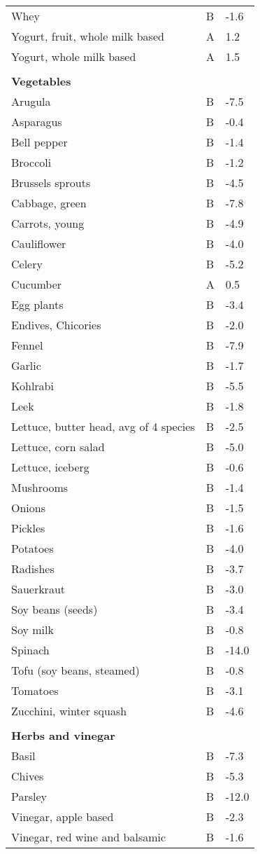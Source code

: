 \documentclass[../main.tex]{subfiles}
\begin{document}
\begin{longtable}{p{7cm}p{0.5cm}p{1cm}}
Whey  & B  & -1.6 \\
Yogurt, fruit, whole milk based  & A  & 1.2 \\
Yogurt, whole milk based  & A  & 1.5 \\
 \\
\multicolumn{3}{l}{\textbf{Vegetables}}  \\
Arugula  & B  & -7.5 \\
Asparagus  & B  & -0.4 \\
Bell pepper  & B  & -1.4 \\
Broccoli  & B  & -1.2 \\
Brussels sprouts  & B  & -4.5 \\
Cabbage, green  & B  & -7.8 \\
Carrots, young  & B  & -4.9 \\
Cauliflower  & B  & -4.0 \\
Celery  & B  & -5.2 \\
Cucumber  & A  & 0.5 \\
Egg plants  & B  & -3.4 \\
Endives, Chicories  & B  & -2.0 \\
Fennel  & B  & -7.9 \\
Garlic   & B  & -1.7 \\
Kohlrabi  & B  & -5.5 \\
Leek  & B  & -1.8 \\
Lettuce, butter head, avg of 4 species  & B  & -2.5 \\
Lettuce, corn salad   & B  & -5.0 \\
Lettuce, iceberg  & B  & -0.6 \\
Mushrooms  & B  & -1.4 \\
Onions  & B  & -1.5 \\
Pickles  & B  & -1.6 \\
Potatoes  & B  & -4.0 \\
Radishes  & B  & -3.7 \\
Sauerkraut  & B  & -3.0 \\
Soy beans (seeds)  & B  & -3.4 \\
Soy milk  & B  & -0.8 \\
Spinach  & B  & -14.0 \\
Tofu (soy beans, steamed)  & B  & -0.8 \\
Tomatoes  & B  & -3.1 \\
Zucchini, winter squash  & B  & -4.6 \\
 \\
\multicolumn{3}{l}{\textbf{Herbs and vinegar}}  \\
Basil  & B  & -7.3 \\
Chives  & B  & -5.3 \\
Parsley  & B  & -12.0 \\
Vinegar, apple based  & B  & -2.3 \\
Vinegar, red wine and balsamic  & B  & -1.6 \\
   \bottomrule
  \end{longtable}
\end{document}
